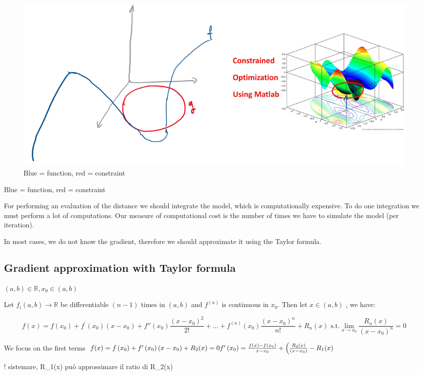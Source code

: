 \begin{figure}
\centering
\includegraphics[width=\textwidth]{example.png}
\caption{Blue = function, red = constraint}
\end{figure}

Blue = function, red = constraint

For performing an evaluation of the distance we should integrate the
model, which is computationally expensive. To do one integration we must
perform a lot of computations. Our measure of computational cost is the
number of times we have to simulate the model (per iteration).

In most cases, we do not know the gradient, therefore we should
approximate it using the Taylor formula.

\hypertarget{gradient-approximation-with-taylor-formula}{%
\subsection{Gradient approximation with Taylor
formula}\label{gradient-approximation-with-taylor-formula}}

$(a,b) \in \mathbb{R}, x_0 \in (a,b)$

Let $f_i(a,b) \rightarrow \mathbb{R}$ be differentiable $(n-1)$ times in
$(a,b)$ and $f^{(n)}$ is continuous in $x_0$. Then let $x \in (a,b)$ ,
we have:

$$
f(x)=f\left(x_0\right)+f^{\prime}\left(x_0\right)\left(x-x_0\right)+f''(x_0)\frac{(x-x_0)^2}{2!}+ ...+ f^{(n)}(x_0)\frac{(x-x_0)^n}{n!} + R_n(x) \text{ s.t.} \lim_{x \rightarrow x_0} \frac{R_n(x)}{(x-x_0)^n} =0 
$$

We focus on the first terms
$f(x)=f\left(x_0\right)+f^{\prime}\left(x_0\right)\left(x-x_0\right)+R_2(x)=0 \\ f^{\prime}\left(x_0\right)=\frac{f(x)-f\left(x_0\right)}{x-x_0}+\left(\frac{R_2(x)}{\left(x-x_0\right)}-R_1(x)\right.$

! sistemare, R\_1(x) può approssimare il ratio di R\_2(x)

